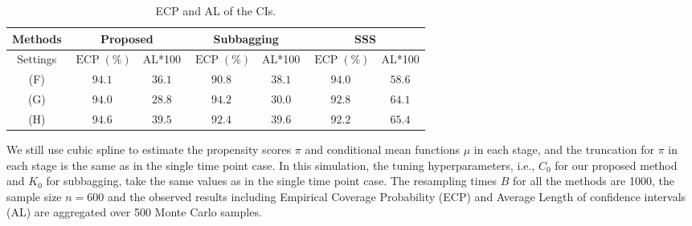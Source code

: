 \documentclass[11pt]{article}
\theoremstyle{referenceplain}
\theoremstyle{referencedefinition}
\theoremstyle{referenceremark}
\begin{document}
\begin{table}[H]
    \centering
   \begin{tabular}{|c|c|c|c|c|c|c|}
\hline Methods & \multicolumn{2}{c|}{ Proposed} & \multicolumn{2}{c}{ Subbagging } & \multicolumn{2}{|c|}{ SSS } \\
\hline Settings  & $\operatorname{ECP}(\%)$ & AL*100 & $\operatorname{ECP}(\%)$ & AL*100 & $\operatorname{ECP}(\%)$ & AL*100 \\
\hline (F) &  $94.1$ & $36.1$ & $90.8$ & $38.1$ & $94.0$ & $58.6$\\
\hline (G) & $94.0$ & $28.8$ & $94.2$ & $30.0$ & $92.8$ & $64.1$\\
\hline (H) &  $94.6$ & $39.5$ & $92.4$ & $39.6$ & $92.2$ & $65.4$\\
\hline
\end{tabular}
    \caption{ECP and AL of the CIs.}
    \label{Multi-sim}
\end{table}
We still use cubic spline to estimate the propensity scores $\pi$ and conditional mean functions $\mu$ in each stage, and the truncation for $\pi$ in each stage is the same as in the single time point case. In this simulation, the tuning hyperparameters, i.e., ${C_0}$ for our proposed method and $K_0$ for subbagging, take the same values as in the single time point case. The resampling times $B$ for all the methods are 1000, the sample size $n=600$ and the observed results including Empirical Coverage Probability (ECP) and Average Length of confidence intervals (AL) are aggregated over 500 Monte Carlo samples.
\end{document}
